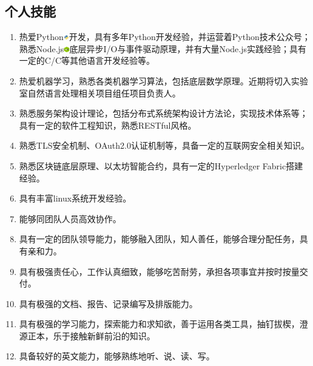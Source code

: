\documentclass[10pt]{article} %
\def\CPP{{C\nolinebreak[4]\hspace{-.05em}\raisebox{.4ex}{\tiny\bf ++}}}
\newcommand{\red}[1]{{\color{headings}{#1}}}
\begin{document}
\begin{paracol}{2}
	\medskip
	
	\section{个人技能}
	
	\begin{enumerate}[font=\color{headings}\bfseries]
		\item \red{开发能力：}热爱Python\includegraphics*[width=0.019\textwidth]{python.png}开发，具有多年Python开发经验，并运营着Python技术公众号；熟悉Node.js\includegraphics*[width=0.019\textwidth]{nodejs.png}底层异步I/O与事件驱动原理，并有大量Node.js实践经验；具有一定的C/\CPP 等其他语言开发经验等。
		\item \red{机器学习：}热爱机器学习，熟悉各类机器学习算法，包括底层数学原理。近期将切入实验室自然语言处理相关项目组任项目负责人。
		\item \red{服务架构设计：}熟悉服务架构设计理论，包括分布式系统架构设计方法论，实现技术体系等；具有一定的软件工程知识，熟悉RESTful风格。
		\item \red{互联网安全：}熟悉TLS安全机制、OAuth2.0认证机制等，具备一定的互联网安全相关知识。
		\item \red{区块链：}熟悉区块链底层原理、以太坊智能合约，具有一定的Hyperledger Fabric搭建经验。
		\item \red{Linux系统：}具有丰富linux系统开发经验。
		\item \red{团队协作能力：}能够同团队人员高效协作。
		\item \red{团队领导能力：}具有一定的团队领导能力，能够融入团队，知人善任，能够合理分配任务，具有亲和力。
		\item \red{工作责任心：}具有极强责任心，工作认真细致，能够吃苦耐劳，承担各项事宜并按时按量交付。
		\item \red{写作能力：}具有极强的文档、报告、记录编写及排版能力。
		\item \red{学习能力：}具有极强的学习能力，探索能力和求知欲，善于运用各类工具，抽钉拔楔，澄源正本，乐于接触新鲜前沿的知识。
		\item \red{英文能力：}具备较好的英文能力，能够熟练地听、说、读、写。
	\end{enumerate}
	

\end{paracol}
\end{document}
